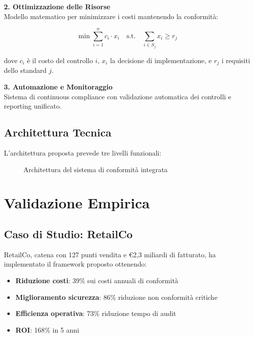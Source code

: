 \textbf{2. Ottimizzazione delle Risorse}\\
Modello matematico per minimizzare i costi mantenendo la conformità:

\begin{equation}
\min \sum_{i=1}^{n} c_i \cdot x_i \quad \text{s.t.} \quad \sum_{i \in S_j} x_i \geq r_j
\end{equation}

dove $c_i$ è il costo del controllo $i$, $x_i$ la decisione di implementazione, e $r_j$ i requisiti dello standard $j$.

\textbf{3. Automazione e Monitoraggio}\\
Sistema di continuous compliance con validazione automatica dei controlli e reporting unificato.

\subsection{Architettura Tecnica}
\label{subsec:4.3.2_architettura}

L'architettura proposta prevede tre livelli funzionali:

\begin{figure}[h]
    \centering
    \caption{Architettura del sistema di conformità integrata}
    \label{fig:architettura}
\end{figure}

\section{Validazione Empirica}
\label{sec:4.4_validazione}

\subsection{Caso di Studio: RetailCo}
\label{subsec:4.4.1_caso}

RetailCo, catena con 127 punti vendita e €2,3 miliardi di fatturato, ha implementato il framework proposto ottenendo:

\begin{itemize}
    \item \textbf{Riduzione costi}: 39\% sui costi annuali di conformità
    \item \textbf{Miglioramento sicurezza}: 86\% riduzione non conformità critiche
    \item \textbf{Efficienza operativa}: 73\% riduzione tempo di audit
    \item \textbf{ROI}: 168\% in 5 anni
\end{itemize}

